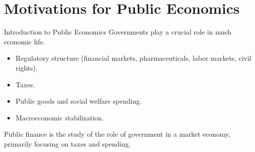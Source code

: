 \documentclass[10pt]{extarticle}
\title{}
\author{Avinash Iyer}
\date{}
\begin{document}
  \section*{Motivations for Public Economics}%
  
  \begin{problem}{Introduction to Public Economics}
    Governments play a crucial role in much economic life.
    \begin{itemize}
      \item Regulatory structure (financial markets, pharmaceuticals, labor markets, civil rights).
      \item Taxes.
      \item Public goods and social welfare spending.
      \item Macroeconomic stabilization.
    \end{itemize}
   Public finance is the study of the role of government in a market economy, primarily focusing on taxes and spending.\\


\end{problem}
\end{document}
